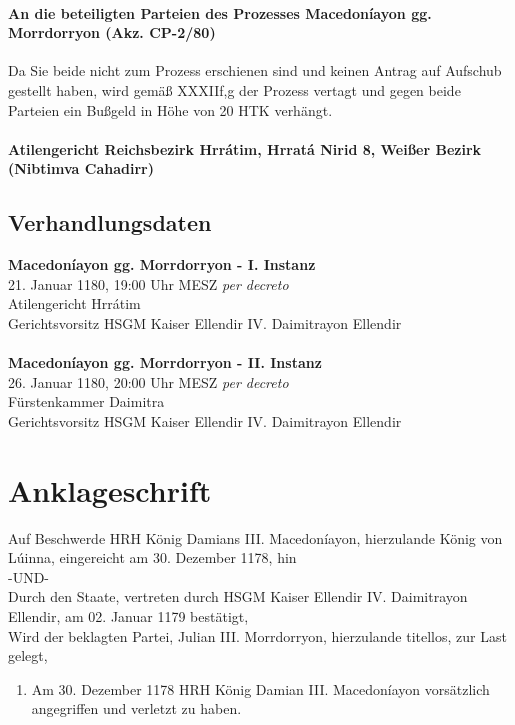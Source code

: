 \documentclass{article}
\begin{document}
\paragraph{An die beteiligten Parteien des Prozesses Macedoníayon gg. Morrdorryon (Akz. CP-2/80)\\}
Da Sie beide nicht zum Prozess erschienen sind und keinen Antrag auf Aufschub gestellt haben, wird gemäß XXXIIf,g der Prozess vertagt und gegen beide Parteien ein Bußgeld in Höhe von 20 HTK verhängt.
\paragraph{Atilengericht Reichsbezirk Hrrátim, Hrratá Nirid 8, Weißer Bezirk (Nibtimva Cahadirr)}
\newpage
\subsection{Verhandlungsdaten}
\textbf{Macedoníayon gg. Morrdorryon - I. Instanz}\\
21. Januar 1180, 19:00 Uhr MESZ \textit{per decreto}\\
Atilengericht Hrrátim\\
Gerichtsvorsitz HSGM Kaiser Ellendir IV. Daimitrayon Ellendir
\\\\
\textbf{Macedoníayon gg. Morrdorryon - II. Instanz}\\
26. Januar 1180, 20:00 Uhr MESZ \textit{per decreto}\\
Fürstenkammer Daimitra\\
Gerichtsvorsitz HSGM Kaiser Ellendir IV. Daimitrayon Ellendir

\newpage
\section{Anklageschrift}
Auf Beschwerde HRH König Damians III. Macedoníayon, hierzulande König von Lúinna, eingereicht am 30. Dezember 1178, hin\\
-UND-\\
Durch den Staate, vertreten durch HSGM Kaiser Ellendir IV. Daimitrayon Ellendir, am 02. Januar 1179 bestätigt,\\
Wird der beklagten Partei, Julian III. Morrdorryon, hierzulande titellos, zur Last gelegt,
\begin{enumerate}
    \item Am 30. Dezember 1178 HRH König Damian III. Macedoníayon vorsätzlich angegriffen und verletzt zu haben.
\end{enumerate}
\end{document}
